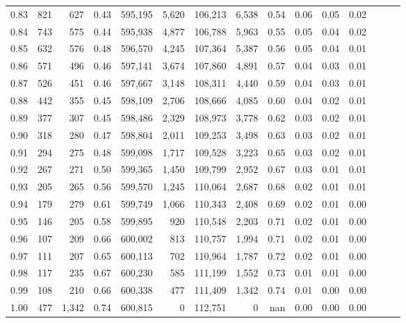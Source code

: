 \begin{tabular}{rrrrrrrrrrrrrrr}
0.83 &     821 &    627 &  0.43 &  595,195 &    5,620 &  106,213 &    6,538 &  0.54 &  0.06 &  0.05 &      0.02 \\
0.84 &     743 &    575 &  0.44 &  595,938 &    4,877 &  106,788 &    5,963 &  0.55 &  0.05 &  0.04 &      0.02 \\
0.85 &     632 &    576 &  0.48 &  596,570 &    4,245 &  107,364 &    5,387 &  0.56 &  0.05 &  0.04 &      0.01 \\
0.86 &     571 &    496 &  0.46 &  597,141 &    3,674 &  107,860 &    4,891 &  0.57 &  0.04 &  0.03 &      0.01 \\
0.87 &     526 &    451 &  0.46 &  597,667 &    3,148 &  108,311 &    4,440 &  0.59 &  0.04 &  0.03 &      0.01 \\
0.88 &     442 &    355 &  0.45 &  598,109 &    2,706 &  108,666 &    4,085 &  0.60 &  0.04 &  0.02 &      0.01 \\
0.89 &     377 &    307 &  0.45 &  598,486 &    2,329 &  108,973 &    3,778 &  0.62 &  0.03 &  0.02 &      0.01 \\
0.90 &     318 &    280 &  0.47 &  598,804 &    2,011 &  109,253 &    3,498 &  0.63 &  0.03 &  0.02 &      0.01 \\
0.91 &     294 &    275 &  0.48 &  599,098 &    1,717 &  109,528 &    3,223 &  0.65 &  0.03 &  0.02 &      0.01 \\
0.92 &     267 &    271 &  0.50 &  599,365 &    1,450 &  109,799 &    2,952 &  0.67 &  0.03 &  0.01 &      0.01 \\
0.93 &     205 &    265 &  0.56 &  599,570 &    1,245 &  110,064 &    2,687 &  0.68 &  0.02 &  0.01 &      0.01 \\
0.94 &     179 &    279 &  0.61 &  599,749 &    1,066 &  110,343 &    2,408 &  0.69 &  0.02 &  0.01 &      0.00 \\
0.95 &     146 &    205 &  0.58 &  599,895 &      920 &  110,548 &    2,203 &  0.71 &  0.02 &  0.01 &      0.00 \\
0.96 &     107 &    209 &  0.66 &  600,002 &      813 &  110,757 &    1,994 &  0.71 &  0.02 &  0.01 &      0.00 \\
0.97 &     111 &    207 &  0.65 &  600,113 &      702 &  110,964 &    1,787 &  0.72 &  0.02 &  0.01 &      0.00 \\
0.98 &     117 &    235 &  0.67 &  600,230 &      585 &  111,199 &    1,552 &  0.73 &  0.01 &  0.01 &      0.00 \\
0.99 &     108 &    210 &  0.66 &  600,338 &      477 &  111,409 &    1,342 &  0.74 &  0.01 &  0.00 &      0.00 \\
1.00 &     477 &  1,342 &  0.74 &  600,815 &        0 &  112,751 &        0 &   nan &  0.00 &  0.00 &      0.00 \\
\bottomrule
\end{tabular}
